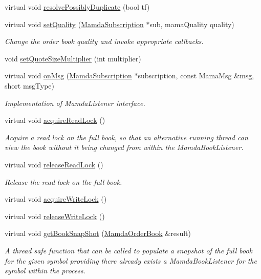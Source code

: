\begin{CompactItemize}
virtual void \hyperlink{classMamdaQuoteToBookListener_37bc9813dd682b3f87909d641116c851}{resolve\-Possibly\-Duplicate} (bool tf)
\item 
virtual void \hyperlink{classMamdaQuoteToBookListener_185182e79f1a315dd2667b44cb466159}{set\-Quality} (\hyperlink{classWombat_1_1MamdaSubscription}{Mamda\-Subscription} $\ast$sub, mama\-Quality quality)
\begin{CompactList}\small\item\em Change the order book quality and invoke appropriate callbacks. \item\end{CompactList}\item 
void \hyperlink{classMamdaQuoteToBookListener_0f61b24aec6c1ca1a916c669bf9ab624}{set\-Quote\-Size\-Multiplier} (int multiplier)
\item 
virtual void \hyperlink{classMamdaQuoteToBookListener_2d57ca85affe2614497a207122ae6193}{on\-Msg} (\hyperlink{classWombat_1_1MamdaSubscription}{Mamda\-Subscription} $\ast$subscription, const Mama\-Msg \&msg, short msg\-Type)
\begin{CompactList}\small\item\em Implementation of Mamda\-Listener interface. \item\end{CompactList}\item 
virtual void \hyperlink{classMamdaQuoteToBookListener_b3aaeea876237a3869a4380c6d12c409}{acquire\-Read\-Lock} ()
\begin{CompactList}\small\item\em Acquire a read lock on the full book, so that an alternative running thread can view the book without it being changed from within the Mamda\-Book\-Listener. \item\end{CompactList}\item 
virtual void \hyperlink{classMamdaQuoteToBookListener_04933309e7df1a0afd2aa8d173e20c7c}{release\-Read\-Lock} ()
\begin{CompactList}\small\item\em Release the read lock on the full book. \item\end{CompactList}\item 
virtual void \hyperlink{classMamdaQuoteToBookListener_e29f743ba0e51a46e8eccf33ac196bfc}{acquire\-Write\-Lock} ()
\item 
virtual void \hyperlink{classMamdaQuoteToBookListener_6c24b1f262c4d571b586fd0c9f5675ee}{release\-Write\-Lock} ()
\item 
virtual void \hyperlink{classMamdaQuoteToBookListener_161cca9523847d042a82af4924c91da6}{get\-Book\-Snap\-Shot} (\hyperlink{classWombat_1_1MamdaOrderBook}{Mamda\-Order\-Book} \&result)
\begin{CompactList}\small\item\em A thread safe function that can be called to populate a snapshot of the full book for the given symbol providing there already exists a Mamda\-Book\-Listener for the symbol within the process. \item\end{CompactList}\end{CompactItemize}


